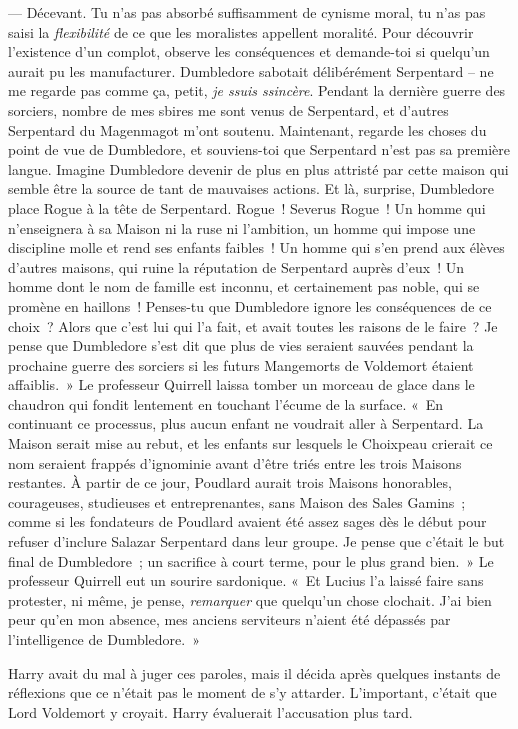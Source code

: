 --- Décevant.
Tu n'as pas absorbé suffisamment de cynisme moral, tu n'as pas saisi la \emph{flexibilité} de ce que les moralistes appellent moralité.
Pour découvrir l'existence d'un complot, observe les conséquences et demande-toi si quelqu'un aurait pu les manufacturer.
Dumbledore sabotait délibérément Serpentard -- ne me regarde pas comme ça, petit, \emph{je ssuis ssincère}.
Pendant la dernière guerre des sorciers, nombre de mes sbires me sont venus de Serpentard, et d'autres Serpentard du Magenmagot m'ont soutenu.
Maintenant, regarde les choses du point de vue de Dumbledore, et souviens-toi que Serpentard n'est pas sa première langue.
Imagine Dumbledore devenir de plus en plus attristé par cette maison qui semble être la source de tant de mauvaises actions.
Et là, surprise, Dumbledore place Rogue à la tête de Serpentard.
Rogue~! Severus Rogue~!
Un homme qui n'enseignera à sa Maison ni la ruse ni l'ambition, un homme qui impose une discipline molle et rend ses enfants faibles~!
Un homme qui s'en prend aux élèves d'autres maisons, qui ruine la réputation de Serpentard auprès d'eux~!
Un homme dont le nom de famille est inconnu, et certainement pas noble, qui se promène en haillons~!
Penses-tu que Dumbledore ignore les conséquences de ce choix~?
Alors que c'est lui qui l'a fait, et avait toutes les raisons de le faire~?
Je pense que Dumbledore s'est dit que plus de vies seraient sauvées pendant la prochaine guerre des sorciers si les futurs Mangemorts de Voldemort étaient affaiblis.~»
Le professeur Quirrell laissa tomber un morceau de glace dans le chaudron qui fondit lentement en touchant l'écume de la surface.
«~En continuant ce processus, plus aucun enfant ne voudrait aller à Serpentard.
La Maison serait mise au rebut, et les enfants sur lesquels le Choixpeau crierait ce nom seraient frappés d'ignominie avant d'être triés entre les trois Maisons restantes.
À partir de ce jour, Poudlard aurait trois Maisons honorables, courageuses, studieuses et entreprenantes, sans Maison des Sales Gamins~; comme si les fondateurs de Poudlard avaient été assez sages dès le début pour refuser d'inclure Salazar Serpentard dans leur groupe.
Je pense que c'était le but final de Dumbledore~; un sacrifice à court terme, pour le plus grand bien.~»
Le professeur Quirrell eut un sourire sardonique.
«~Et Lucius l'a laissé faire sans protester, ni même, je pense, \emph{remarquer} que quelqu'un chose clochait.
J'ai bien peur qu'en mon absence, mes anciens serviteurs n'aient été dépassés par l'intelligence de Dumbledore.~»

Harry avait du mal à juger ces paroles, mais il décida après quelques instants de réflexions que ce n'était pas le moment de s'y attarder.
L'important, c'était que Lord Voldemort y croyait.
Harry évaluerait l'accusation plus tard.

